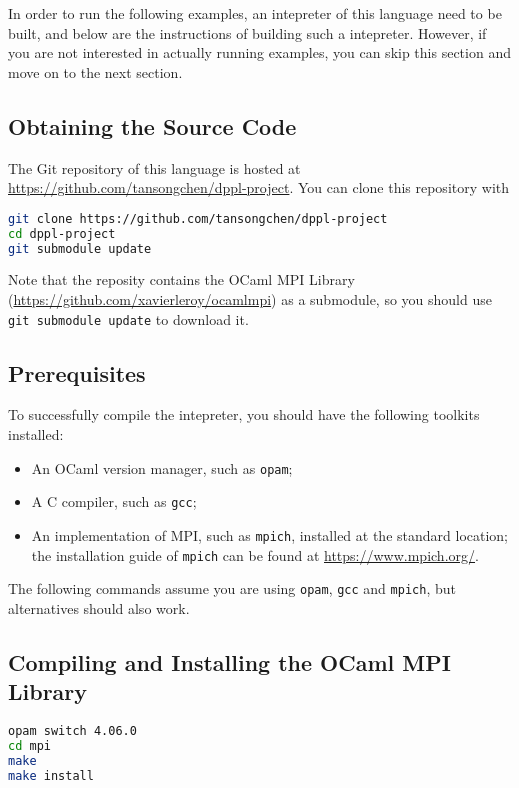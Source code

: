 \documentclass{report}
\begin{document}
In order to run the following examples, an intepreter of this language need to be built, and below are the instructions of building such a intepreter. However, if you are not interested in actually running examples, you can skip this section and move on to the next section.

\subsection{Obtaining the Source Code}

The Git repository of this language is hosted at \url{https://github.com/tansongchen/dppl-project}. You can clone this repository with

\begin{lstlisting}[language=bash,caption={Obtaining the Source Code}]
git clone https://github.com/tansongchen/dppl-project
cd dppl-project
git submodule update
\end{lstlisting}

Note that the reposity contains the OCaml MPI Library (\url{https://github.com/xavierleroy/ocamlmpi}) as a submodule, so you should use \verb|git submodule update| to download it.

\subsection{Prerequisites}

To successfully compile the intepreter, you should have the following toolkits installed:

\begin{itemize}
  \item An OCaml version manager, such as \verb|opam|;
  \item A C compiler, such as \verb|gcc|;
  \item An implementation of MPI, such as \verb|mpich|\cite{mpich}, installed at the standard location; the installation guide of \verb|mpich| can be found at \url{https://www.mpich.org/}.
\end{itemize}

The following commands assume you are using \verb|opam|, \verb|gcc| and \verb|mpich|, but alternatives should also work.

\subsection{Compiling and Installing the OCaml MPI Library}

\begin{lstlisting}[language=bash,caption={Compiling and Installing the OCaml MPI Library}]
opam switch 4.06.0
cd mpi
make
make install
\end{lstlisting}
\end{document}

